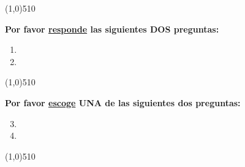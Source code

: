 \documentclass{article}
\begin{document}
\line(1,0){510}

\clearpage
\newpage

{\bf Por favor \underline{responde} las siguientes DOS preguntas:} 


\begin{enumerate}
    \item {\unskip}
    
    \item {\unskip}
\end{enumerate}    

\line(1,0){510}


{\bf Por favor \underline{escoge} UNA de las siguientes dos preguntas:} 


\begin{enumerate}
\setcounter{enumi}{2}
    \item {\unskip} 
    
   \item {\unskip} 
\end{enumerate}    

\line(1,0){510}


\clearpage
\end{document}
